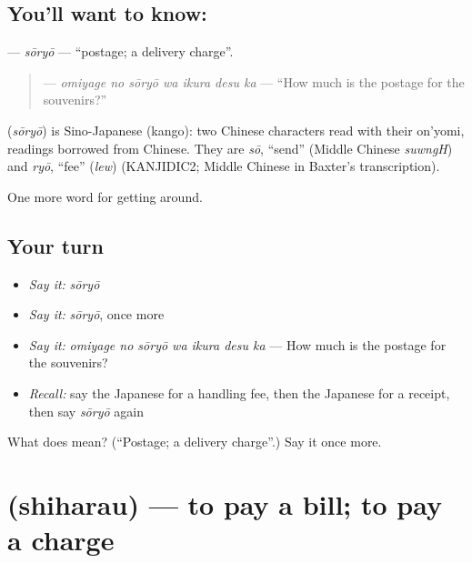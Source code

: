 \subsection*{You'll want to know: }
\textbf{} — \emph{sōryō} — \textquotedblleft{}postage; a delivery charge\textquotedblright{}.

\begin{quote}
\textbf{  } — \emph{omiyage no sōryō wa ikura desu ka} — \textquotedblleft{}How much is the postage for the souvenirs?\textquotedblright{}
\end{quote}

\begin{cousinweb}
\textbf{} (\emph{sōryō}) is Sino-Japanese (kango): two Chinese characters read with their on'yomi, readings borrowed from Chinese. They are \emph{sō}, \textquotedblleft{}send\textquotedblright{} (Middle Chinese \emph{suwngH}) and \emph{ryō}, \textquotedblleft{}fee\textquotedblright{} (\emph{lew}) (KANJIDIC2; Middle Chinese in Baxter's transcription).
\end{cousinweb}

\begin{grammarlens}[title={What you've built}]
One more word for getting around.
\end{grammarlens}

\subsection*{Your turn}
\begin{itemize}
\raggedright
  \item \emph{Say it:} \emph{sōryō}
  \item \emph{Say it:} \emph{sōryō}, once more
  \item \emph{Say it:} \emph{omiyage no sōryō wa ikura desu ka} — How much is the postage for the souvenirs?
  \item \emph{Recall:} say the Japanese for a handling fee, then the Japanese for a receipt, then say \emph{sōryō} again
\end{itemize}

\begin{tcolorbox}[breakable,colback=teal!4,colframe=teal!35!black,title={Before you move on}]
What does  mean? (\textquotedblleft{}Postage; a delivery charge\textquotedblright{}.) Say it once more.
\end{tcolorbox}
\section[\texorpdfstring{\ja{しはらう} (shiharau)}{しはらう (shiharau)}]{ (shiharau) — to pay a bill; to pay a charge}

